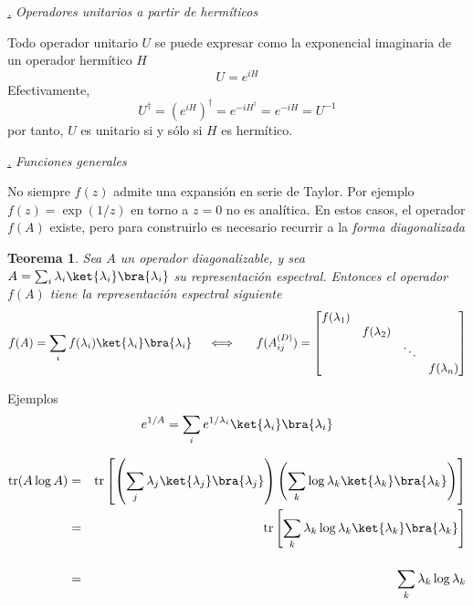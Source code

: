 \documentclass[a4paper,11pt]{book} %
\newtheorem{teorema_contador}{Teorema}
\newcommand{\Teorema}[1]{
		\begin{mybox_gray2}{}
			\begin{teorema_contador}
				 #1 
			\end{teorema_contador} 
		\end{mybox_gray2}
	}
\numberwithin{equation}{chapter}
\def\subsubiContadorIt{\par\addtocounter{subsubsection}{1}\underline{\it\thesubsubsection.}\hskip0.5cm \setcounter{subsubsubsectionIt}{0}}
\newcommand{\SubsubiIt}[1]{
		\subsubiContadorIt \textit{#1}
	}
\newcounter{subsubsubsectionIt}[subsubsection]
\begin{document}
			\SubsubiIt{Operadores unitarios a partir de hermíticos}

Todo operador unitario $U$ se puede expresar como la exponencial imaginaria de un operador hermítico $H$
	\begin{equation}
	U = e^{i H}
	\end{equation}
Efectivamente, 
	\begin{equation}
	U^\dagger = \left(e^{i H}\right)^\dagger = e^{-i H^\dagger} = e^{-i H}=U^{-1}
	\end{equation}
por tanto, $U$ es unitario si y sólo si $H$ es hermítico.


			\SubsubiIt{Funciones generales}

No siempre $f(z)$ admite una expansión en serie de Taylor. Por ejemplo $f(z) = \exp(1/z)$ en torno a $z=0$ no es analítica. En estos casos, el operador $f(A)$ existe, pero para construirlo es necesario recurrir a la \textit{forma diagonalizada}

	\Teorema{\label{teorema_formalismo_funciones_sobre_operador_diagonal}
	Sea $A$ un operador diagonalizable, y sea $A= \sum_i \lambda_i \ket{\lambda_i}\bra{\lambda_i}$ su representación espectral. Entonces el operador $f(A)$ tiene la representación espectral siguiente  
	\begin{equation}
	f(A) = \sum_i f(\lambda_i) \ket{\lambda_i}\bra{\lambda_i}~~~~\Longleftrightarrow~~~~~
f(A^{(D)}_{ij}) = \begin{bmatrix} f(\lambda_1)& &  & \\ & f(\lambda_2) & &  \\ & & \ddots & \\ & & & f(\lambda_n)
\end{bmatrix}
	\end{equation}
	}

	\begin{mybox_green}{Ejemplos}
	\begin{equation}
	e^{1/A} = \sum_i e^{1/\lambda_i} \ket{\lambda_i}\bra{\lambda_i}
	\end{equation}
	
	\begin{eqnarray*}
	{\rm tr}(A \log A) &=& {\rm tr}\left[\left(\sum_j \lambda_j \ket{\lambda_j}\bra{\lambda_j}\right)\left(\sum_k\log \lambda_k \ket{\lambda_k}\bra{\lambda_k}\right)\right]\nonumber\\
	&=& {\rm tr}\left[\sum_k \lambda_k \log\lambda_k \ket{\lambda_k}\bra{\lambda_k} \right] \\
	&=& \sum_k \lambda_k \log \lambda_k \rule{0mm}{8mm}
	\end{eqnarray*}
	\end{mybox_green}
\end{document}
